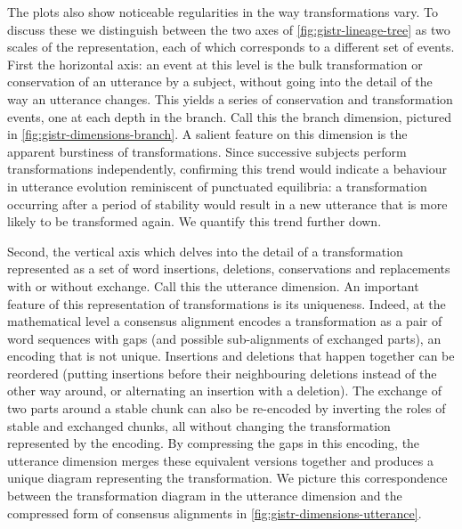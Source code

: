 The plots also show noticeable regularities in the way transformations
vary. To discuss these we distinguish between the two axes of
\cref{fig:gistr-lineage-tree} as two scales of the representation, each
of which corresponds to a different set of events. First the horizontal
axis: an event at this level is the bulk transformation or conservation
of an utterance by a subject, without going into the detail of the way
an utterance changes. This yields a series of conservation and
transformation events, one at each depth in the branch. Call this the
branch dimension, pictured in \cref{fig:gistr-dimensions-branch}. A
salient feature on this dimension is the apparent burstiness of
transformations. Since successive subjects perform transformations
independently, confirming this trend would indicate a behaviour in
utterance evolution reminiscent of punctuated equilibria: a
transformation occurring after a period of stability would result in a
new utterance that is more likely to be transformed again. We quantify
this trend further down.

Second, the vertical axis which delves into the detail of a
transformation represented as a set of word insertions, deletions,
conservations and replacements with or without exchange. Call this the
utterance dimension. An important feature of this representation of
transformations is its uniqueness. Indeed, at the mathematical level a
consensus alignment encodes a transformation as a pair of word sequences
with gaps (and possible sub-alignments of exchanged parts), an encoding
that is not unique. Insertions and deletions that happen together can be
reordered (putting insertions before their neighbouring deletions
instead of the other way around, or alternating an insertion with a
deletion). The exchange of two parts around a stable chunk can also be
re-encoded by inverting the roles of stable and exchanged chunks, all
without changing the transformation represented by the encoding. By
compressing the gaps in this encoding, the utterance dimension merges
these equivalent versions together and produces a unique diagram
representing the transformation. We picture this correspondence between
the transformation diagram in the utterance dimension and the compressed
form of consensus alignments in \cref{fig:gistr-dimensions-utterance}.

